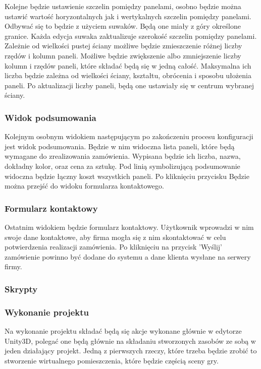 \documentclass{article} %
\begin{document}
        Kolejne będzie ustawienie szczelin pomiędzy panelami, osobno będzie można ustawić wartość horyzontalnych jak i wertykalnych szczelin pomiędzy panelami. Odbywać się to będzie z użyciem suwaków. Będą one miały z góry określone granice. Każda edycja suwaka zaktualizuje szerokość szczelin pomiędzy panelami.
        \\
        
        Zależnie od wielkości pustej ściany możliwe będzie zmieszczenie różnej liczby rzędów i kolumn paneli. Możliwe będzie zwiększenie albo zmniejszenie liczby kolumn i rzędów paneli, które składać będą się w jedną całość. Maksymalna ich liczba będzie zależna od wielkości ściany, kształtu, obrócenia i sposobu ułożenia paneli. Po aktualizacji liczby paneli, będą one ustawiały się w centrum wybranej ściany.
        \\
        
        \subsubsection*{Widok podsumowania}
        Kolejnym osobnym widokiem następującym po zakończeniu procesu konfiguracji jest widok podsumowania. Będzie w nim widoczna lista paneli, które będą wymagane do zrealizowania zamówienia. Wypisana będzie ich liczba, nazwa, dokładny kolor, oraz cena za sztukę. Pod linią symbolizującą podsumowanie widoczna będzie łączny koszt wszystkich paneli. Po kliknięciu przycisku Będzie można przejść do widoku formularza kontaktowego.
        \\
        
        \subsubsection*{Formularz kontaktowy}
        Ostatnim widokiem będzie formularz kontaktowy. Użytkownik  wprowadzi w nim swoje dane kontaktowe, aby firma mogła się z nim skontaktować w celu potwierdzenia realizacji zamówienia. Po kliknięciu na przycisk 'Wyślij' zamówienie powinno być dodane do systemu a dane klienta wysłane na serwery firmy.
        \\
        
        
        \subsubsection{Skrypty}
        
        
        \subsubsection{Wykonanie projektu}
        Na wykonanie projektu składać będą się akcje wykonane głównie w edytorze Unity3D, polegać one będą głównie na składaniu stworzonych zasobów ze sobą w jeden działający projekt. Jedną z pierwszych rzeczy, które trzeba będzie zrobić to stworzenie wirtualnego pomieszczenia, które będzie częścią sceny gry.
        \\
        
\end{document}
